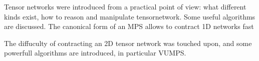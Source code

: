 Tensor networks were introduced from a practical point of view: what different kinds exist, how to reason and manipulate tensornetwork. Some useful algorithms are discussed. The canonical form of an MPS allows to contract 1D networks fast

The diffuculty of contracting an 2D tensor network was touched upon, and some powerfull algorithms are introduced, in particular VUMPS.

